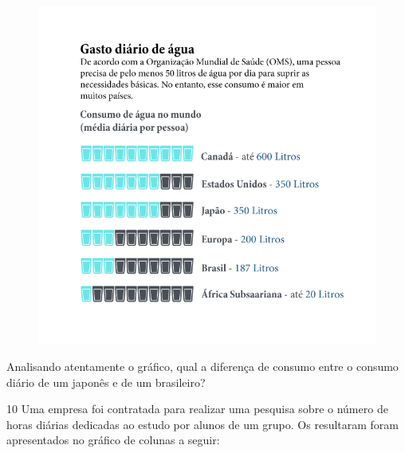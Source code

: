 \begin{figure}[htpb!]
\includegraphics[width=\textwidth]{../ilustracoes/MAT5/SAEB_5ANO_MAT_figura108.png}
\end{figure}

Analisando atentamente o gráfico, qual a diferença de consumo entre o
consumo diário de um japonês e de um brasileiro?



\num{10} Uma empresa foi contratada para realizar uma pesquisa sobre o
número de horas diárias dedicadas ao estudo por alunos de um grupo.
Os resultaram foram apresentados no gráfico de colunas a seguir:

